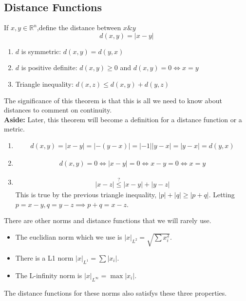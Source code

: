 \documentclass[a4paper]{article}
\numberwithin{equation}{section}
\newcommand{\R}{\mathbb{R}}
\begin{document}
\subsection{Distance Functions}
\begin{definition}
    If $x, y\in\R^n$,define the distance between $x\&y$
    \begin{equation}
        d(x,y)=|x-y|
    \end{equation}
\end{definition}
\begin{theorem}
    \begin{enumerate}
        \item $d$ is symmetric: $d(x,y)=d(y,x)$
        \item $d$ is positive definite: $d(x,y)\geq0$ and $d(x,y)=0\iff x=y$
        \item Triangle inequality: $d(x,z)\leq d(x,y)+d(y,z)$
    \end{enumerate}
    The significance of this theorem is that this is all we need to know about distances to comment on continuity.\\
    \textbf{Aside:} Later, this theorem will become a definition for a distance function or a metric.
    \begin{prooof}
        \begin{enumerate}
            \item \begin{align}
                d(x,y)=|x-y|=|-(y-x)|=|-1||y-x|=|y-x|=d(y,x)
            \end{align}
            \item \begin{align}
                d(x,y)=0\iff |x-y|=0\iff x-y=0\iff x=y
            \end{align}
            \item \begin{align}
                |x-z|\stackrel{?}{\leq}|x-y|+|y-z|
            \end{align}
            This is true by the previous triangle inequality, $|p|+|q|\geq|p+q|$. Letting $p=x-y,q=y-z\implies p+q=x-z$.
        \end{enumerate}
    \end{prooof}

    There are other norms and distance functions that we will rarely use.

    \begin{itemize}
        \item The euclidian norm which we use is $|x|_{L^2}=\sqrt{\sum x_i^2}$.
        \item There is a L1 norm $|x|_{L^1}=\sum|x_i|$.
        \item The L-infinity norm is $|x|_{L^\infty}=\max |x_i|$.
    \end{itemize}
    The distance functions for these norms also satisfys these three properties.
\end{theorem}
\end{document}
